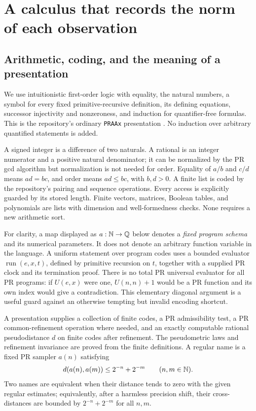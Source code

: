 \section{A calculus that records the norm of each observation}\label{sec:foundation}

\subsection{Arithmetic, coding, and the meaning of a presentation}

We use intuitionistic first-order logic with equality, the natural numbers,
a symbol for every fixed primitive-recursive definition, its defining
equations, successor injectivity and nonzeroness, and induction for
quantifier-free formulas. This is the repository's ordinary
\texttt{PRAAx} presentation \cite{repo-pr}. No induction over arbitrary
quantified statements is added.

A signed integer is a difference of two naturals. A rational is an integer
numerator and a positive natural denominator; it can be normalized by the
PR gcd algorithm but normalization is not needed for order. Equality of
$a/b$ and $c/d$ means $ad=bc$, and order means $ad\le bc$, with $b,d>0$.
A finite list is coded by the repository's pairing and sequence operations.
Every access is explicitly guarded by its stored length. Finite vectors,
matrices, Boolean tables, and polynomials are lists with dimension and
well-formedness checks. None requires a new arithmetic sort.

For clarity, a map displayed as $a:\mathbb N\to\mathbb Q$ below denotes a \emph{fixed
program schema} and its numerical parameters. It does not denote an
arbitrary function variable in the language. A uniform statement over
program codes uses a bounded evaluator $\operatorname{run}(e,x,t)$, defined
by primitive recursion on $t$, together with a supplied PR clock and its
termination proof. There is no total PR universal evaluator for all PR
programs: if $U(e,x)$ were one, $U(n,n)+1$ would be a PR function and its own
index would give a contradiction. This elementary diagonal argument is a
useful guard against an otherwise tempting but invalid encoding shortcut.

\begin{definition}\label{def:presentation}
A presentation supplies a collection of finite codes, a PR admissibility
test, a PR common-refinement operation where needed, and an exactly
computable rational pseudodistance $d$ on finite codes after refinement.
The pseudometric laws and refinement invariance are proved from the
finite definitions. A regular name is a fixed PR sampler $a(n)$ satisfying
\begin{equation}\label{eq:regular-name}
 d(a(n),a(m))\le2^{-n}+2^{-m}\qquad(n,m\in\mathbb N).
\end{equation}
Two names are equivalent when their distance tends to zero with the given
regular estimates; equivalently, after a harmless precision shift, their
cross-distances are bounded by $2^{-n}+2^{-m}$ for all $n,m$.
\end{definition}

